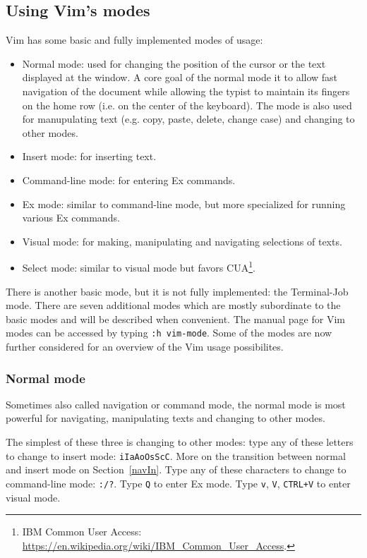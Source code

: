 \documentclass{article}
\begin{document}
\subsection{Using Vim's modes}\label{modes}
Vim has some basic and fully implemented modes of usage:
\begin{itemize}
  \item Normal mode: used for changing
  the position of the cursor or the text displayed
  at the window.
  A core goal of the normal mode it to allow fast
  navigation of the document while allowing
  the typist to maintain its fingers on the home row
  (i.e. on the center of the keyboard).
  The mode is also used for manupulating text
  (e.g. copy, paste, delete, change case) and
    changing to other modes.
  \item Insert mode: for inserting text.
  \item Command-line mode: for entering Ex commands.
  \item Ex mode: similar to command-line mode,
  but more specialized for running various Ex commands.
  \item Visual mode: for making, manipulating and navigating
  selections of texts.
  \item Select mode: similar to visual mode but
  favors CUA\footnote{IBM Common User Access: \url{https://en.wikipedia.org/wiki/IBM_Common_User_Access}.}.
\end{itemize}

There is another basic mode, but it is not fully implemented:
the Terminal-Job mode.
There are seven additional modes which are mostly subordinate 
to the basic modes and will be described when convenient.
The manual page for Vim modes can be accessed by typing
\texttt{:h vim-mode}.
Some of the modes are now further considered for
an overview of the Vim usage possibilites.

\subsubsection{Normal mode}\label{normal}
Sometimes also called navigation or command mode,
the normal mode is most powerful for
navigating, manipulating texts and changing to other modes.

The simplest of these three is changing to other modes:
type any of these letters to change to insert mode:
\texttt{iIaAoOsScC}. More on the transition between
normal and insert mode on Section~\ref{navIn}.
Type any of these characters to change to command-line mode:
\texttt{:/?}.
Type \texttt{Q} to enter Ex mode.
Type \texttt{v}, \texttt{V}, \texttt{CTRL+V} to enter visual mode.
\end{document}
